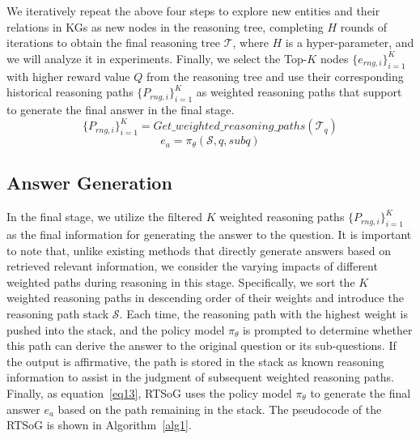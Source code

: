 \documentclass[lettersize,journal]{IEEEtran}
\begin{document}
We iteratively repeat the above four steps to explore new entities and their relations in KGs as new nodes in the reasoning tree, completing $H$ rounds of iterations to obtain the final reasoning tree $\mathcal{T}$, where $H$ is a hyper-parameter, and we will analyze it in experiments. Finally, we select the Top-$K$ nodes $\{e_{rng, i}\}^{K}_{i=1}$ with higher reward value $Q$ from the reasoning tree and use their corresponding historical reasoning paths $\{P_{rng, i}\}^{K}_{i=1}$ as weighted reasoning paths that support to generate the final answer in the final stage.
\begin{equation}
    \{P_{rng, i}\}^{K}_{i=1} = Get\_weighted\_reasoning\_paths(\mathcal{T}_{q})
    \label{eq12}
\end{equation}
\begin{equation}
    e_a = \pi_{\theta}(\mathcal{S}, q, subq)
    \label{eq13}
\end{equation}

\subsection{Answer Generation}
In the final stage, we utilize the filtered $K$ weighted reasoning paths $\{P_{rng, i}\}^{K}_{i=1}$ as the final information for generating the answer to the question. It is important to note that, unlike existing methods that directly generate answers based on retrieved relevant information, we consider the varying impacts of different weighted paths during reasoning in this stage. Specifically, we sort the $K$ weighted reasoning paths in descending order of their weights and introduce the reasoning path stack $\mathcal{S}$. Each time, the reasoning path with the highest weight is pushed into the stack, and the policy model $\pi_{\theta}$ is prompted to determine whether this path can derive the answer to the original question or its sub-questions. If the output is affirmative, the path is stored in the stack as known reasoning information to assist in the judgment of subsequent weighted reasoning paths. Finally, as equation~\ref{eq13}, RTSoG uses the policy model $\pi_{\theta}$ to generate the final answer $e_a$ based on the path remaining in the stack. The pseudocode of the RTSoG is shown in Algorithm~\ref{alg1}.
\end{document}
